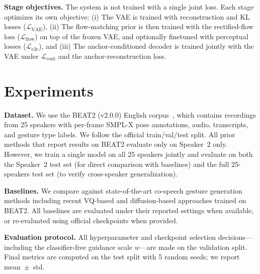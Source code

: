 \noindent \textbf{Stage objectives.}
The system is not trained with a single joint loss.
Each stage optimizes its own objective:
(i) The VAE is trained with reconstruction and KL losses ($\mathcal{L}_\text{VAE}$),
(ii) The flow-matching prior is then trained with the rectified-flow loss ($\mathcal{L}_\text{flow}$) on top of the frozen VAE, and optionally finetuned with perceptual losses ($\mathcal{L}_\text{e2e}$), and
(iii) The anchor-conditioned decoder is trained jointly with the VAE under $\mathcal{L}_\text{cont}$ and the anchor-reconstruction loss.


\section{Experiments}
\label{sec:experiments}
\noindent \textbf{Dataset.}
We use the BEAT2 (v2.0.0) English corpus~\cite{emage2024}, which contains recordings from 25 speakers with per-frame SMPL-X pose annotations, audio, transcripts, and gesture type labels.
We follow the official train/val/test split.
All prior methods that report results on BEAT2 evaluate only on Speaker~2 only.
However, we train a single model on all 25 speakers jointly and evaluate on both the Speaker~2 test set (for direct comparison with baselines) and the full 25-speakers test set (to verify cross-speaker generalization).

\noindent \textbf{Baselines.}
We compare against state-of-the-art co-speech gesture generation methods including recent VQ-based and diffusion-based approaches trained on BEAT2.
All baselines are evaluated under their reported settings when available, or re-evaluated using official checkpoints when provided.


\noindent \textbf{Evaluation protocol.}
All hyperparameter and checkpoint selection decisions---including the classifier-free guidance scale $w$---are made on the validation split.
Final metrics are computed on the test split with 5 random seeds; we report mean~$\pm$~std.

